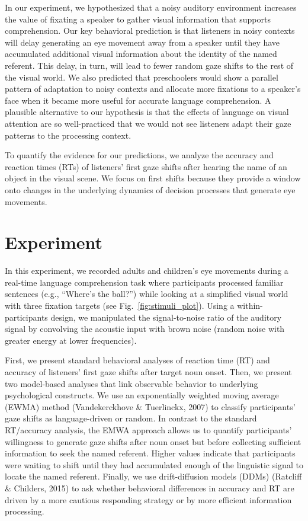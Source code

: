 \documentclass[10pt, letterpaper]{article}
\begin{document}
In our experiment, we hypothesized that a noisy auditory environment
increases the value of fixating a speaker to gather visual information
that supports comprehension. Our key behavioral prediction is that
listeners in noisy contexts will delay generating an eye movement away
from a speaker until they have accumulated additional visual information
about the identity of the named referent. This delay, in turn, will lead
to fewer random gaze shifts to the rest of the visual world. We also
predicted that preschoolers would show a parallel pattern of adaptation
to noisy contexts and allocate more fixations to a speaker's face when
it became more useful for accurate language comprehension. A plausible
alternative to our hypothesis is that the effects of language on visual
attention are so well-practiced that we would not see listeners adapt
their gaze patterns to the processing context.

To quantify the evidence for our predictions, we analyze the accuracy
and reaction times (RTs) of listeners' first gaze shifts after hearing
the name of an object in the visual scene. We focus on first shifts
because they provide a window onto changes in the underlying dynamics of
decision processes that generate eye movements.

\hypertarget{experiment}{%
\section{Experiment}\label{experiment}}

In this experiment, we recorded adults and children's eye movements
during a real-time language comprehension task where participants
processed familiar sentences (e.g., ``Where's the ball?'') while looking
at a simplified visual world with three fixation targets (see
Fig.~\ref{fig:stimuli_plot}). Using a within-participants design, we
manipulated the signal-to-noise ratio of the auditory signal by
convolving the acoustic input with brown noise (random noise with
greater energy at lower frequencies).

First, we present standard behavioral analyses of reaction time (RT) and
accuracy of listeners' first gaze shifts after target noun onset. Then,
we present two model-based analyses that link observable behavior to
underlying psychological constructs. We use an exponentially weighted
moving average (EWMA) method (Vandekerckhove \& Tuerlinckx, 2007) to
classify participants' gaze shifts as language-driven or random. In
contrast to the standard RT/accuracy analysis, the EMWA approach allows
us to quantify participants' willingness to generate gaze shifts after
noun onset but before collecting sufficient information to seek the
named referent. Higher values indicate that participants were waiting to
shift until they had accumulated enough of the linguistic signal to
locate the named referent. Finally, we use drift-diffusion models (DDMs)
(Ratcliff \& Childers, 2015) to ask whether behavioral differences in
accuracy and RT are driven by a more cautious responding strategy or by
more efficient information processing.
\end{document}
